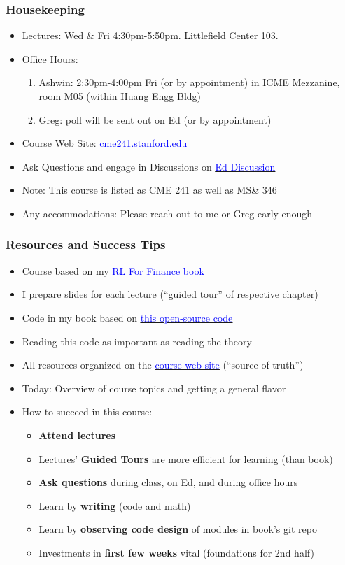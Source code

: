 \documentclass[handout]{beamer}
\begin{document}
\begin{frame}
\frametitle{Housekeeping}
\pause
\begin{itemize}[<+->]
\item Lectures: Wed \& Fri 4:30pm-5:50pm. Littlefield Center 103.
\item Office Hours:
\begin{enumerate}
	\item  Ashwin: 2:30pm-4:00pm Fri (or by appointment) in ICME Mezzanine, room M05 (within Huang Engg Bldg)
	\item  Greg: poll will be sent out on Ed (or by appointment)
\end{enumerate}
\item Course Web Site: \href{http://cme241.stanford.edu}{\underline{\textcolor{blue}{cme241.stanford.edu}}}
\item Ask Questions and engage in Discussions on \href{https://edstem.org/us/courses/49954}{\underline{\textcolor{blue}{Ed Discussion}}}
\item Note: This course is listed as CME 241 as well as MS\& 346
\item Any accommodations: Please reach out to me or Greg early enough
\end{itemize}
\end{frame}


\begin{frame}
\frametitle{Resources and Success Tips}
\pause
\begin{itemize}[<+->]
\item Course based on my \href{http://stanford.edu/~ashlearn/RLForFinanceBook/book.pdf}{\underline{\textcolor{blue}{RL For Finance book}}}
\item I prepare slides for each lecture (``guided tour'' of respective chapter)
\item Code in my book based on \href{https://github.com/TikhonJelvis/RL-Book}{\underline{\textcolor{blue}{this open-source code}}}
\item Reading this code as important as reading the theory 
\item All resources organized on the \href{http://cme241.stanford.edu}{\underline{\textcolor{blue}{course web site}}} (``source of truth'')
\item Today: Overview of course topics and getting a general flavor
\item How to succeed in this course:
\begin{itemize}
\item {\bf Attend lectures}
\item Lectures' {\bf Guided Tours} are more efficient for learning (than book)
\item {\bf Ask questions} during class, on Ed, and during office hours
\item Learn by {\bf writing} (code and math)
\item Learn by {\bf observing code design} of modules in book's git repo
\item Investments in {\bf first few weeks} vital (foundations for 2nd half)
\end{itemize}
\end{itemize}
\end{frame}
\end{document}
